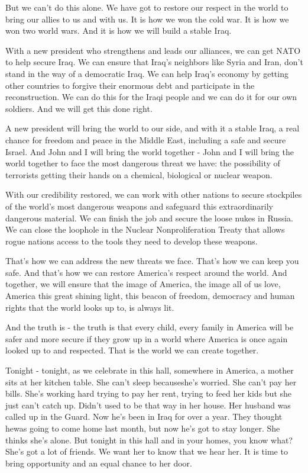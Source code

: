 But we can't do this alone. We have got to restore our respect in the
world to bring our allies to us and with us. It is how we won the cold
war. It is how we won two world wars. And it is how we will build a
stable Iraq.

With a new president who strengthens and leads our alliances, we can get
NATO to help secure Iraq. We can ensure that Iraq's neighbors like Syria
and Iran, don't stand in the way of a democratic Iraq. We can help
Iraq's economy by getting other countries to forgive their enormous debt
and participate in the reconstruction. We can do this for the Iraqi
people and we can do it for our own soldiers. And we will get this done
right.

A new president will bring the world to our side, and with it a stable
Iraq, a real chance for freedom and peace in the Middle East, including
a safe and secure Israel. And John and I will bring the world together -
John and I will bring the world together to face the most dangerous
threat we have: the possibility of terrorists getting their hands on a
chemical, biological or nuclear weapon.

With our credibility restored, we can work with other nations to secure
stockpiles of the world's most dangerous weapons and safeguard this
extraordinarily dangerous material. We can finish the job and secure the
loose nukes in Russia. We can close the loophole in the Nuclear
Nonproliferation Treaty that allows rogue nations access to the tools
they need to develop these weapons.

That's how we can address the new threats we face. That's how we can
keep you safe. And that's how we can restore America's respect around
the world. And together, we will ensure that the image of America, the
image all of us love, America this great shining light, this beacon of
freedom, democracy and human rights that the world looks up to, is
always lit.

And the truth is - the truth is that every child, every family in
America will be safer and more secure if they grow up in a world where
America is once again looked up to and respected. That is the world we
can create together.

Tonight - tonight, as we celebrate in this hall, somewhere in America, a
mother sits at her kitchen table. She can't sleep becauseshe's worried.
She can't pay her bills. She's working hard trying to pay her rent,
trying to feed her kids but she just can't catch up. Didn't used to be
that way in her house. Her husband was called up in the Guard. Now he's
been in Iraq for over a year. They thought hewas going to come home last
month, but now he's got to stay longer. She thinks she's alone. But
tonight in this hall and in your homes, you know what? She's got a lot
of friends. We want her to know that we hear her. It is time to bring
opportunity and an equal chance to her door.

